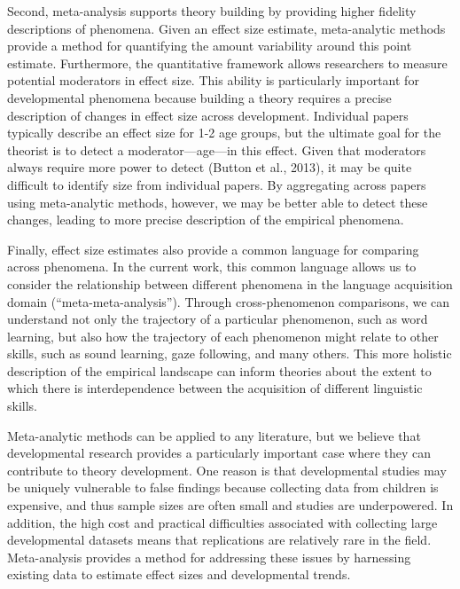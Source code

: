 \documentclass[9pt,twocolumn,twoside,lineno]{pnas-new}
\begin{document}
Second, meta-analysis supports theory building by providing higher
fidelity descriptions of phenomena. Given an effect size estimate,
meta-analytic methods provide a method for quantifying the amount
variability around this point estimate. Furthermore, the quantitative
framework allows researchers to measure potential moderators in effect
size. This ability is particularly important for developmental phenomena
because building a theory requires a precise description of changes in
effect size across development. Individual papers typically describe an
effect size for 1-2 age groups, but the ultimate goal for the theorist
is to detect a moderator---age---in this effect. Given that moderators
always require more power to detect (Button et al., 2013), it may be
quite difficult to identify size from individual papers. By aggregating
across papers using meta-analytic methods, however, we may be better
able to detect these changes, leading to more precise description of the
empirical phenomena.

Finally, effect size estimates also provide a common language for
comparing across phenomena. In the current work, this common language
allows us to consider the relationship between different phenomena in
the language acquisition domain (\enquote{meta-meta-analysis}). Through
cross-phenomenon comparisons, we can understand not only the trajectory
of a particular phenomenon, such as word learning, but also how the
trajectory of each phenomenon might relate to other skills, such as
sound learning, gaze following, and many others. This more holistic
description of the empirical landscape can inform theories about the
extent to which there is interdependence between the acquisition of
different linguistic skills.

Meta-analytic methods can be applied to any literature, but we believe
that developmental research provides a particularly important case where
they can contribute to theory development. One reason is that
developmental studies may be uniquely vulnerable to false findings
because collecting data from children is expensive, and thus sample
sizes are often small and studies are underpowered. In addition, the
high cost and practical difficulties associated with collecting large
developmental datasets means that replications are relatively rare in
the field. Meta-analysis provides a method for addressing these issues
by harnessing existing data to estimate effect sizes and developmental
trends.
\end{document}
